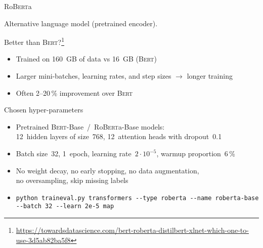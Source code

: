 \documentclass[english,handout]{mlutalk}
\newcommand{\Bert}{\textsc{Bert}\xspace}
\newcommand{\BertBase}{\Bert-Base\xspace}
\newcommand{\Roberta}{\mbox{Ro\textsc{Bert}a}\xspace}
\newcommand{\RobertaBase}{\Roberta-Base\xspace}
\begin{document}
\begin{frame}{\Roberta~\cite{LiuOGDJCLLZS2019}}

  Alternative language model (pretrained encoder).

  \begin{block}{Better than \Bert?\footnote{\tiny\smaller\url{https://towardsdatascience.com/bert-roberta-distilbert-xlnet-which-one-to-use-3d5ab82ba5f8}}}
    \begin{itemize}
      \item Trained on 160~GB of data vs 16~GB (\Bert)
      \item Larger mini-batches, learning rates, and step sizes \(\to\) longer training
      \item Often 2--20\,\% improvement over \Bert
    \end{itemize}
  \end{block}

  \begin{block}{Chosen hyper-parameters}
    \begin{itemize}
      \item Pretrained \BertBase~/~\RobertaBase models: \\ 12~hidden layers of size~768, 12~attention heads with dropout~0.1
      \item Batch size~32, 1~epoch, learning rate~\(2 \cdot 10^{-5}\), warmup proportion~6\,\%
      \item No weight decay, no early stopping, no data augmentation, \\ no oversampling, skip missing labels
      \item {\tiny\lstinline{python traineval.py transformers --type roberta --name roberta-base --batch 32 --learn 2e-5 map}}
    \end{itemize}
  \end{block}
\end{frame}
\end{document}
